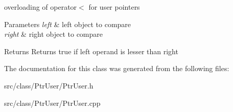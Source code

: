 overloading of operator$<$ for user pointers 


\begin{DoxyParams}{Parameters}
{\em left} & left object to compare \\
\hline
{\em right} & right object to compare\\
\hline
\end{DoxyParams}
\begin{DoxyReturn}{Returns}
Returns true if left operand is lesser than right 
\end{DoxyReturn}


The documentation for this class was generated from the following files\+:\begin{DoxyCompactItemize}
\item 
src/class/\+Ptr\+User/Ptr\+User.\+h\item 
src/class/\+Ptr\+User/Ptr\+User.\+cpp\end{DoxyCompactItemize}
